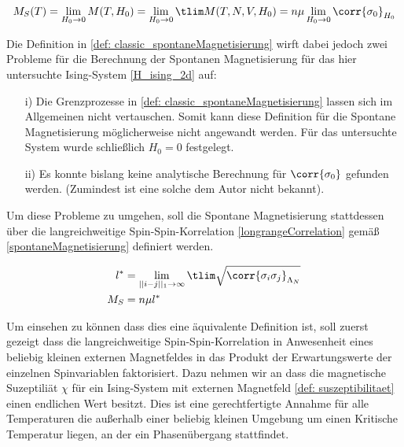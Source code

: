 \begin{equation} \label{def: classic_spontaneMagnetisierung}
M_S(T) = \lim_{H_0 \rightarrow 0} M(T, H_0) = \lim_{H_0 \rightarrow 0} \tlim M(T,N,V,H_0) =  n \mu \lim_{H_0 \rightarrow 0} \corr{\sigma_0}_{H_0} 
\end{equation}

\noindent Die Definition in \eqref{def: classic_spontaneMagnetisierung} wirft dabei jedoch zwei Probleme für die Berechnung der Spontanen  Magnetisierung für das hier untersuchte Ising-System \eqref{H_ising_2d} auf:

\begin{itemize}
\item [i)] Die Grenzprozesse in \eqref{def: classic_spontaneMagnetisierung} lassen sich im Allgemeinen nicht vertauschen. Somit kann diese Definition für die Spontane Magnetisierung möglicherweise nicht angewandt werden. Für das untersuchte System wurde schließlich $H_0 = 0$ festgelegt. 
\item [ii)] Es konnte bislang keine analytische Berechnung für $\corr{\sigma_0}$ gefunden werden.  (Zumindest ist eine solche dem Autor nicht bekannt). 
\end{itemize}

\noindent Um diese Probleme zu umgehen, soll die Spontane Magnetisierung stattdessen über die langreichweitige Spin-Spin-Korrelation \eqref{longrangeCorrelation} gemäß \eqref{spontaneMagnetisierung} definiert werden. 

\begin{grayframe}[frametitle = {Spontane Magnetisierung}]
\begin{align}
l^* & = \lim_{||i-j||_1 \rightarrow \infty} \tlim \sqrt{\corr{\sigma_i\sigma_j}_{\Lambda_N}} \label{longrangeCorrelation}\\ 
M_S   & = n \mu l^* \label{spontaneMagnetisierung}
\end{align}
\end{grayframe}

\noindent Um einsehen zu können dass dies eine äquivalente Definition ist, soll zuerst gezeigt dass die langreichweitige Spin-Spin-Korrelation in Anwesenheit eines beliebig kleinen externen Magnetfeldes in das Produkt der Erwartungswerte der einzelnen Spinvariablen faktorisiert. Dazu nehmen wir an dass die magnetische Suzeptiliät $\chi$ für ein Ising-System mit externen Magnetfeld \eqref{def: suszeptibilitaet} einen endlichen Wert besitzt. Dies ist eine gerechtfertigte Annahme für alle Temperaturen die außerhalb einer beliebig kleinen Umgebung um einen Kritische Temperatur liegen, an der ein Phasenübergang stattfindet.

